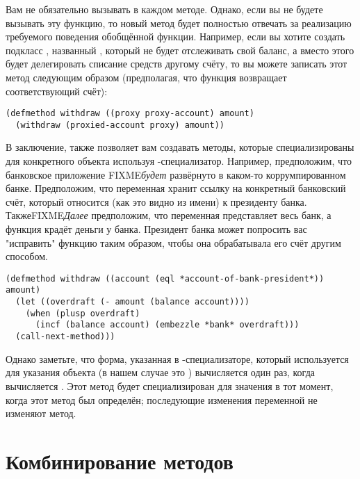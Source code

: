 Вам не обязательно вызывать  в каждом методе.  Однако, если вы не
будете вызывать эту функцию, то новый метод будет полностью отвечать за реализацию
требуемого поведения обобщённой функции.  Например, если вы хотите создать подкласс
, названный , который не будет отслеживать свой
баланс, а вместо этого будет делегировать списание средств другому счёту, то вы можете
записать этот метод следующим образом (предполагая, что функция 
возвращает соответствующий счёт):

\begin{lstlisting}
(defmethod withdraw ((proxy proxy-account) amount)
  (withdraw (proxied-account proxy) amount))
\end{lstlisting}

В заключение,  также позволяет вам создавать методы, которые
специализированы для конкретного объекта используя -специализатор.  Например,
предположим, что банковское приложение FIXME\textit{будет} развёрнуто в каком-то
коррумпированном банке.  Предположим, что переменная 
хранит ссылку на конкретный банковский счёт, который относится (как это видно из имени) к
президенту банка.  ТакжеFIXME\textit{Далее} предположим, что переменная 
представляет весь банк, а функция  крадёт деньги у банка.  Президент банка
может попросить вас "исправить" функцию  таким образом, чтобы она
обрабатывала его счёт другим способом.

\begin{lstlisting}
(defmethod withdraw ((account (eql *account-of-bank-president*)) amount)
  (let ((overdraft (- amount (balance account))))
    (when (plusp overdraft)
      (incf (balance account) (embezzle *bank* overdraft)))
  (call-next-method)))
\end{lstlisting}

Однако заметьте, что форма, указанная в -специализаторе, который используется
для указания объекта (в нашем случае это ) вычисляется
один раз, когда вычисляется .  Этот метод будет специализирован для
значения  в тот момент, когда этот метод был определён;
последующие изменения переменной не изменяют метод.

\section{Комбинирование методов}

